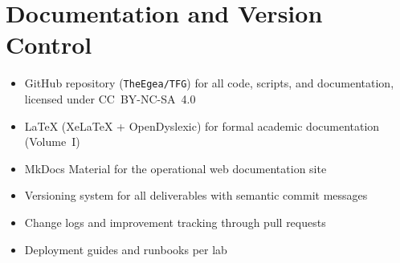 \section{Documentation and Version Control}

\begin{itemize}
\item GitHub repository (\texttt{TheEgea/TFG}) for all code, scripts, and documentation,
      licensed under CC~BY-NC-SA~4.0
\item LaTeX (XeLaTeX + OpenDyslexic) for formal academic documentation (Volume~I)
\item MkDocs Material for the operational web documentation site
\item Versioning system for all deliverables with semantic commit messages
\item Change logs and improvement tracking through pull requests
\item Deployment guides and runbooks per lab
\end{itemize}
